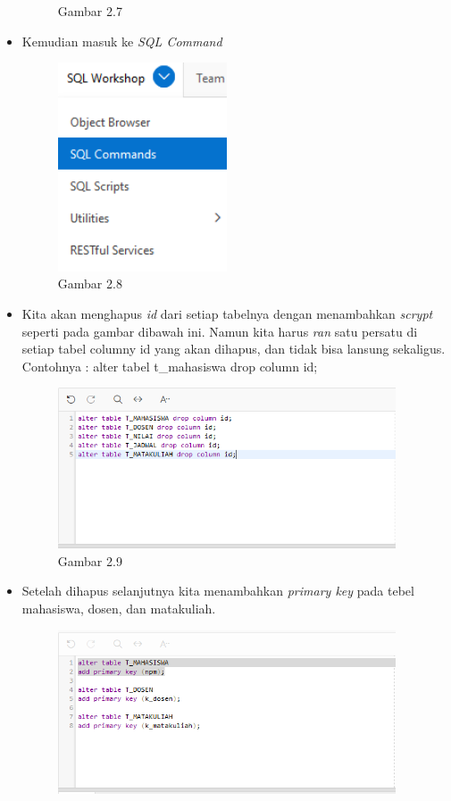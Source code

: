 \documentclass{article}
\begin{document}
\begin{itemize}
\begin{figure}[ht]
                    \caption{Gambar 2.7}
                \end{figure}
            \item Kemudian masuk ke \textit{SQL Command}
                \begin{figure}[ht]
                    \centerline{\includegraphics[width=5cm]{Untitled.PNG}}
                    \caption{Gambar 2.8}
                \end{figure}
            \newpage
            \item Kita akan menghapus \textit{id} dari setiap tabelnya dengan menambahkan \textit{scrypt} seperti pada gambar dibawah ini. Namun kita harus \textit{ran} satu persatu di setiap tabel columny id yang akan dihapus, dan tidak bisa lansung sekaligus. Contohnya : alter tabel t\_mahasiswa drop column id;
                \begin{figure}[ht]
                    \centerline{\includegraphics[width=10cm]{baru.PNG}}
                    \caption{Gambar 2.9}
                \end{figure}
            \item Setelah dihapus selanjutnya kita menambahkan \textit{primary key} pada tebel mahasiswa, dosen, dan matakuliah.
                \begin{figure}[ht]
                    \centerline{\includegraphics[width=10cm]{baru1.PNG}}

\end{figure}
\end{itemize}
\end{document}
